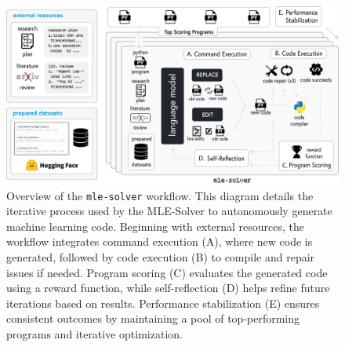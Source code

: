 \documentclass[11pt, a4paper]{gdm_format}
\begin{document}


\begin{figure}
    \centering
    \includegraphics[width=0.90\linewidth]{images/jpgs/mle-solver.jpg}
    \caption{Overview of the \texttt{mle-solver} workflow. This diagram details the iterative process used by the MLE-Solver to autonomously generate  machine learning code. Beginning with external resources, the workflow integrates command execution (A), where new code is generated, followed by code execution (B) to compile and repair issues if needed. Program scoring (C) evaluates the generated code using a reward function, while self-reflection (D) helps refine future iterations based on results. Performance stabilization (E) ensures consistent outcomes by maintaining a pool of top-performing programs and iterative optimization.}
    \label{fig:mle-solver}
\end{figure}
\end{document}
